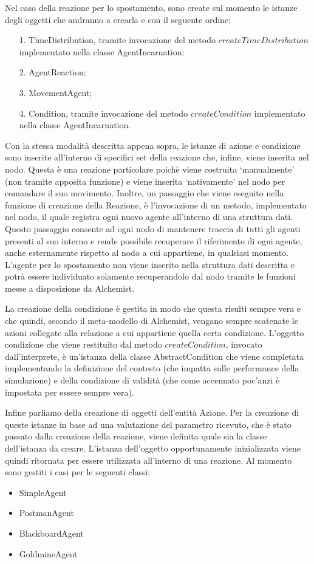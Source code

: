 Nel caso della reazione per lo spostamento, sono create sul momento le istanze degli oggetti che andranno a crearla e con il seguente ordine:
\begin{itemize}
\item[1.] TimeDistribution, tramite invocazione del metodo $createTimeDistribution$ implementato nella classe AgentIncarnation;
\item[2.] AgentReaction;
\item[3.] MovementAgent;
\item[4.] Condition, tramite invocazione del metodo $createCondition$ implementato nella classe AgentIncarnation.
\end{itemize}
Con la stessa modalità descritta appena sopra, le istanze di azione e condizione sono inserite all'interno di specifici set della reazione che, infine, viene inserita nel nodo. Questa è una reazione particolare poichè viene costruita `manualmente' (non tramite apposita funzione) e viene inserita `nativamente' nel nodo per comandare il suo movimento.
%
Inoltre, un passaggio che viene eseguito nella funzione di creazione della Reazione, è l'invocazione di un metodo, implementato nel nodo, il quale registra ogni nuovo agente all'interno di una struttura dati. Questo passaggio consente ad ogni nodo di mantenere traccia di tutti gli agenti presenti al suo interno e rende possibile recuperare il riferimento di ogni agente, anche esternamente rispetto al nodo a cui appartiene, in qualsiasi momento.
L'agente per lo spostamento non viene inserito nella struttura dati descritta e potrà essere individuato solamente recuperandolo dal nodo tramite le funzioni messe a disposizione da Alchemist.

La creazione della condizione è gestita in modo che questa risulti sempre vera e che quindi, secondo il meta-modello di Alchemist, vengano sempre scatenate le azioni collegate alla relazione a cui appartiene quella certa condizione. L'oggetto condizione che viene restituito dal metodo $createCondition$, invocato dall'interprete, è un'istanza della classe AbstractCondition che viene completata implementando la definizione del contesto (che impatta sulle performance della simulazione) e della condizione di validità (che come accennato poc'anzi è impostata per essere sempre vera).

Infine parliamo della creazione di oggetti dell'entità Azione. Per la creazione di queste istanze in base ad una valutazione del parametro ricevuto, che è stato passato dalla creazione della reazione, viene definita quale sia la classe dell'istanza da creare.
L'istanza dell'oggetto opportunamente inizializzata viene quindi ritornata per essere utilizzata all'interno di una reazione.
Al momento sono gestiti i casi per le seguenti classi:
\begin{itemize}
\item SimpleAgent
\item PostmanAgent
\item BlackboardAgent
\item GoldmineAgent
\end{itemize}


